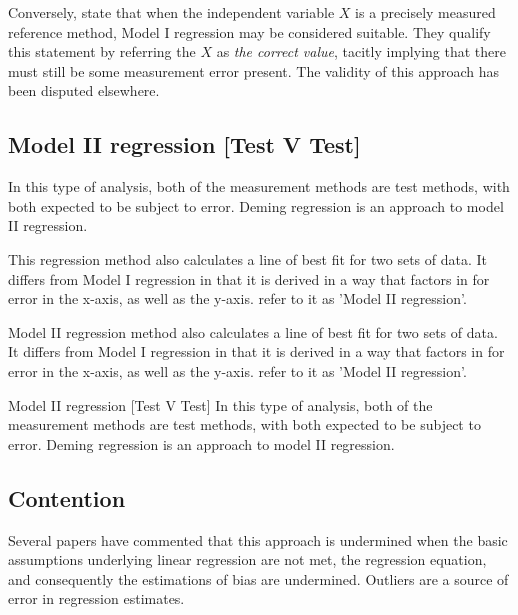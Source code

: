 \documentclass[12pt, a4paper]{report}
\theoremstyle{plain}
\theoremstyle{definition}
\theoremstyle{remark}
\begin{document}
Conversely, \citet{CornCoch} state that when the independent
variable $X$ is a precisely measured reference method, Model I
regression may be considered suitable. They qualify this statement
by referring the $X$ as \emph{the correct value}, tacitly
implying that there must still be some measurement error present.
The validity of this approach has been disputed elsewhere.

 
\subsection{Model II regression [Test V Test]}
In this type of analysis, both of the measurement methods are test methods, with both expected to be subject to error. Deming regression is an approach to model II regression.






 

This regression method also calculates a line of best fit for two sets of data. It differs from Model I regression in that it is derived in a way that factors in for error in the x-axis, as well as the y-axis. \citet{CornCoch} refer to it as 'Model II regression'.

Model II regression method also calculates a line of best fit for two sets of data. It differs from Model I regression in that it is derived in a way that factors in for error in the x-axis, as well as the y-axis. \citet{CornCoch} refer to it as 'Model II regression'.

Model II regression [Test V Test] In this type of analysis, both of the measurement methods are test methods, with both expected to be subject to error. Deming regression is an approach to model II regression.
	




\subsection{Contention }
Several papers have commented that this approach is undermined
when the basic assumptions underlying linear regression are not
met, the regression equation, and consequently the estimations of
bias are undermined. Outliers are a source of error in regression
estimates.
\end{document}
